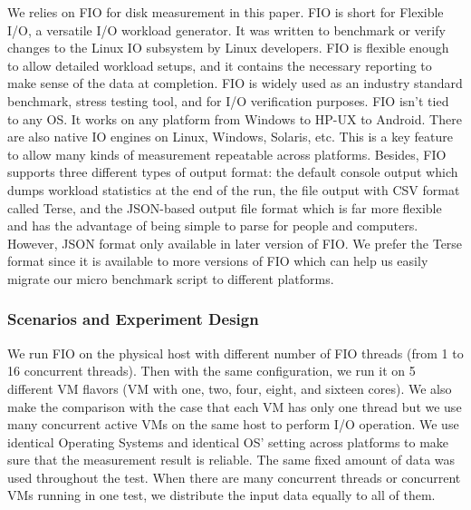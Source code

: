 \documentclass{acmsig}
\begin{document}
We relies on FIO for disk measurement in this paper. FIO is short for Flexible I/O, a versatile I/O workload generator. It was written to benchmark or verify changes to the Linux IO subsystem by Linux developers. FIO is flexible enough to allow detailed workload setups, and it contains the necessary reporting to make sense of the data at completion. FIO is widely used as an industry standard benchmark, stress testing tool, and for I/O verification purposes. FIO isn't tied to any OS. It works on any platform from Windows to HP-UX to Android. There are also native IO engines on Linux, Windows, Solaris, etc. This is a key feature to allow many kinds of measurement repeatable across platforms. Besides, FIO supports three different types of output format: the default console output which dumps workload statistics at the end of the run, the file output with CSV format called Terse, and the JSON-based output file format which is far more flexible and has the advantage of being simple to parse for people and computers. However, JSON format only available in later version of FIO. We prefer the Terse format since it is available to more versions of FIO which can help us easily migrate our micro benchmark script to different platforms.

\subsubsection{Scenarios and Experiment Design}

We run FIO on the physical host with different number of FIO threads (from 1 to 16 concurrent threads). Then with the same configuration, we run it on 5 different VM flavors (VM with one, two, four, eight, and sixteen cores). We also make the comparison with the case that each VM has only one thread but we use many concurrent active VMs on the same host to perform I/O operation. We use identical Operating Systems and identical OS' setting across platforms to make sure that the measurement result is reliable. The same fixed amount of data was used throughout the test. When there are many concurrent threads or concurrent VMs running in one test, we distribute the input data equally to all of them.
\end{document}
